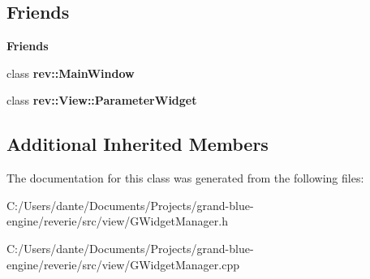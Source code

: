 \subsection*{Friends}
\begin{Indent}\textbf{ Friends}\par
\begin{DoxyCompactItemize}
\item 
\mbox{\label{classrev_1_1_view_1_1_widget_manager_ade55ae5977531931dd9bc00afa349cb5}} 
class {\bfseries rev\+::\+Main\+Window}
\item 
\mbox{\label{classrev_1_1_view_1_1_widget_manager_af5a45bb8dbed55fedd580901be813e68}} 
class {\bfseries rev\+::\+View\+::\+Parameter\+Widget}
\end{DoxyCompactItemize}
\end{Indent}
\subsection*{Additional Inherited Members}


The documentation for this class was generated from the following files\+:\begin{DoxyCompactItemize}
\item 
C\+:/\+Users/dante/\+Documents/\+Projects/grand-\/blue-\/engine/reverie/src/view/G\+Widget\+Manager.\+h\item 
C\+:/\+Users/dante/\+Documents/\+Projects/grand-\/blue-\/engine/reverie/src/view/G\+Widget\+Manager.\+cpp\end{DoxyCompactItemize}
